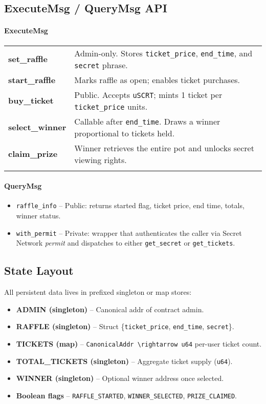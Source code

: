 \documentclass[12pt]{article}
\begin{document}
\subsection*{ExecuteMsg / QueryMsg API}
\paragraph{ExecuteMsg}
\begin{tabular}{@{}lp{9cm}@{}}
  \textbf{set\_raffle} & Admin-only. Stores \verb|ticket_price|, \verb|end_time|, and \verb|secret| phrase. \\ \addlinespace[0.1em]
  \textbf{start\_raffle} & Marks raffle as open; enables ticket purchases. \\ \addlinespace[0.1em]
  \textbf{buy\_ticket} & Public. Accepts \verb|uSCRT|; mints 1 ticket per \verb|ticket_price| units. \\ \addlinespace[0.1em]
  \textbf{select\_winner} & Callable after \verb|end_time|. Draws a winner proportional to tickets held. \\ \addlinespace[0.1em]
  \textbf{claim\_prize} & Winner retrieves the entire pot and unlocks secret viewing rights. \\ \addlinespace[0.2em]
\end{tabular}

\paragraph{QueryMsg}
\begin{itemize}
  \item \verb|raffle_info| – Public: returns started flag, ticket price, end time, totals, winner status.
  \item \verb|with_permit| – Private: wrapper that authenticates the caller via Secret Network \emph{permit} and dispatches to either \verb|get_secret| or \verb|get_tickets|.
\end{itemize}

\subsection*{State Layout}
All persistent data lives in prefixed singleton or map stores:
\begin{itemize}
  \item \textbf{ADMIN (singleton)} – Canonical addr of contract admin.
  \item \textbf{RAFFLE (singleton)} – Struct \{\verb|ticket_price|, \verb|end_time|, \verb|secret|\}.
  \item \textbf{TICKETS (map)} – \verb|CanonicalAddr \rightarrow u64| per-user ticket count.
  \item \textbf{TOTAL\_TICKETS (singleton)} – Aggregate ticket supply (\verb|u64|).
  \item \textbf{WINNER (singleton)} – Optional winner address once selected.
  \item \textbf{Boolean flags} – \verb|RAFFLE_STARTED|, \verb|WINNER_SELECTED|, \verb|PRIZE_CLAIMED|.
\end{itemize}
\end{document}
